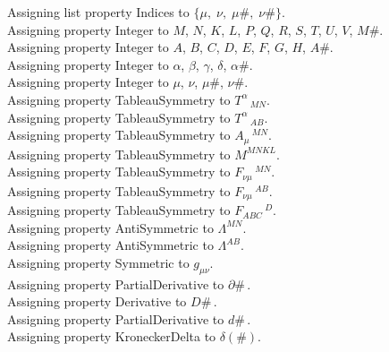 \documentclass[11pt]{article}
\begin{document}
Assigning list property Indices to $\{\mu,\; \nu,\; \mu\#,\; \nu\#\}$.
\\
Assigning property Integer to $M$, $N$, $K$, $L$, $P$, $Q$, $R$, $S$, $T$, $U$, $V$, $M\#$.
\\
Assigning property Integer to $A$, $B$, $C$, $D$, $E$, $F$, $G$, $H$, $A\#$.
\\
Assigning property Integer to $\alpha$, $\beta$, $\gamma$, $\delta$, $\alpha\#$.
\\
Assigning property Integer to $\mu$, $\nu$, $\mu\#$, $\nu\#$.
\\
Assigning property TableauSymmetry to ${T}^{\alpha}\,_{M N}$.
\\
Assigning property TableauSymmetry to ${T}^{\alpha}\,_{A B}$.
\\
Assigning property TableauSymmetry to ${A}_{\mu}\,^{M N}$.
\\
Assigning property TableauSymmetry to ${M}^{M N K L}$.
\\
Assigning property TableauSymmetry to ${F}_{\nu \mu}\,^{M N}$.
\\
Assigning property TableauSymmetry to ${F}_{\nu \mu}\,^{A B}$.
\\
Assigning property TableauSymmetry to ${F}_{A B C}\,^{D}$.
\\
Assigning property AntiSymmetric to ${\Lambda}^{M N}$.
\\
Assigning property AntiSymmetric to ${\Lambda}^{A B}$.
\\
Assigning property Symmetric to ${g}_{\mu \nu}$.
\\
Assigning property PartialDerivative to $\partial{\#}\, $.
\\
Assigning property Derivative to $D{\#}\, $.
\\
Assigning property PartialDerivative to $d{\#}\, $.
\\
Assigning property KroneckerDelta to $\delta(\#)$.
\end{document}
